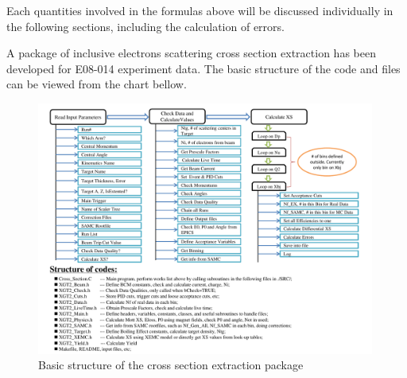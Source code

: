 \documentclass[a4paper,10.5pt]{report}
\begin{document}
Each quantities involved in the formulas above will be discussed individually in the following sections, including the calculation of errors. 

A package of inclusive electrons scattering cross section extraction has been developed for E08-014 experiment data. The basic structure of the code and files can be viewed from the chart bellow.

\begin{figure}[!ht]
 \includegraphics[type=pdf, ext=.pdf,read=.pdf,width=0.99\textwidth]{../figures/XS_Chart}
 \caption[Basic structure of XS package]{Basic structure of the cross section extraction package}
 \label{xs_chart}
\end{figure}
\end{document}
